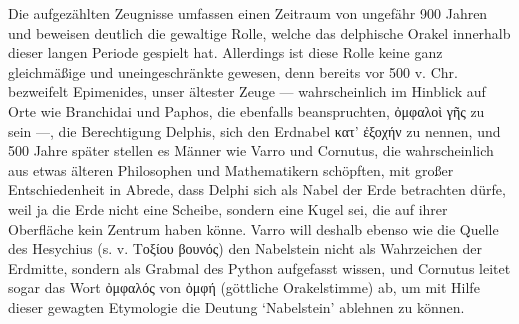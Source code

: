 \documentclass[a4paper, 11pt, oneside]{article}
\begin{document}
Die aufgezählten Zeugnisse umfassen einen Zeitraum von ungefähr 900 Jahren und beweisen deutlich die gewaltige Rolle, welche das delphische Orakel innerhalb dieser langen Periode gespielt hat. Allerdings ist diese Rolle keine ganz gleichmäßige und uneingeschränkte gewesen, denn bereits vor 500 v. Chr. bezweifelt Epimenides, unser ältester Zeuge --- wahrscheinlich im Hinblick auf Orte wie Branchidai und Paphos, die ebenfalls beanspruchten, ὀμφαλοὶ γῆς zu sein ---, die Berechtigung Delphis, sich den Erdnabel κατ' ἐξοχήν zu nennen, und 500 Jahre später stellen es Männer wie Varro und Cornutus, die wahrscheinlich aus etwas älteren Philosophen und Mathematikern schöpften, mit großer Entschiedenheit in Abrede, dass Delphi sich als Nabel der Erde betrachten dürfe, weil ja die Erde nicht eine Scheibe, sondern eine Kugel sei, die auf ihrer Oberfläche kein Zentrum haben könne. Varro will deshalb ebenso wie die Quelle des Hesychius (s. v. Τοξίου βουνός) den Nabelstein nicht als Wahrzeichen der Erdmitte, sondern als Grabmal des Python aufgefasst wissen, und Cornutus leitet sogar das Wort ὀμφαλός von ὀμφή (göttliche Orakelstimme) ab, um mit Hilfe dieser gewagten Etymologie die Deutung `Nabelstein' ablehnen zu können.
\end{document}
